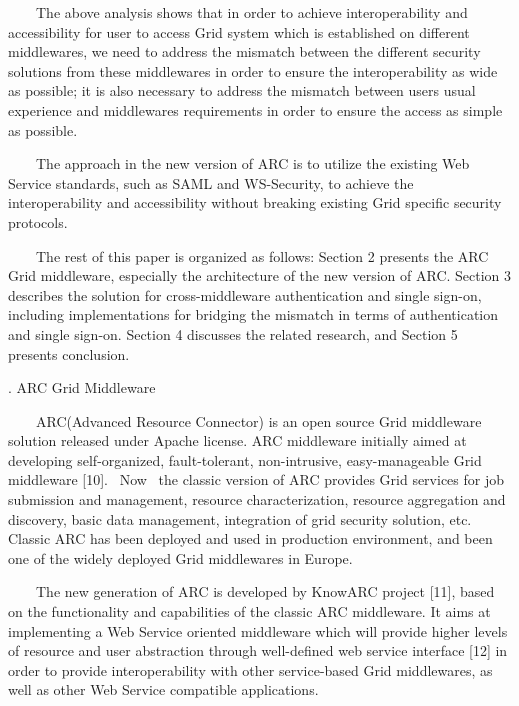\documentclass{article}
\begin{document}
\ \ \ \ The above analysis shows that in order to achieve
interoperability and accessibility for user to access Grid system which
is established on different middlewares, we need to address the
mismatch between the different security solutions from these
middlewares in order to ensure the interoperability as wide as
possible; it is also necessary to address the mismatch between
users{\textquotesingle} usual experience and
middleware{\textquotesingle}s requirements in order to ensure the
access as simple as possible.

\ \ \ \ The approach in the new version of ARC is to utilize the
existing Web Service standards, such as SAML and WS-Security, to
achieve the interoperability and accessibility without breaking
existing Grid specific security protocols.

\ \ \ \ The rest of this paper is organized as follows: Section 2
presents the ARC Grid middleware, especially the architecture of the
new version of ARC. Section 3 describes the solution for
cross-middleware authentication and single sign-on, including
implementations for bridging the mismatch in terms of authentication
and single sign-on. Section 4 discusses the related research, and
Section 5 presents conclusion.


\bigskip

{. ARC Grid Middleware 
\par}

\ \ \ \ ARC(Advanced Resource Connector) is an open source Grid
middleware solution released under Apache license. ARC middleware
initially aimed at developing self-organized, fault-tolerant,
non-intrusive, easy-manageable Grid middleware [10]. \ Now \ the
classic version of ARC provides Grid services for job submission and
management, resource characterization, resource aggregation and
discovery, basic data management, integration of grid security
solution, etc. Classic ARC has been deployed and used in production
environment, and been one of the widely deployed Grid middlewares in
Europe.

\ \ \ \ The new generation of ARC is developed by KnowARC project [11],
based on the functionality and capabilities of the classic ARC
middleware. It aims at implementing a Web Service oriented middleware
which will provide higher levels of resource and user abstraction
through well-defined web service interface [12] in order to provide
interoperability with other service-based Grid middlewares, as well as
other Web Service compatible applications.
\end{document}
